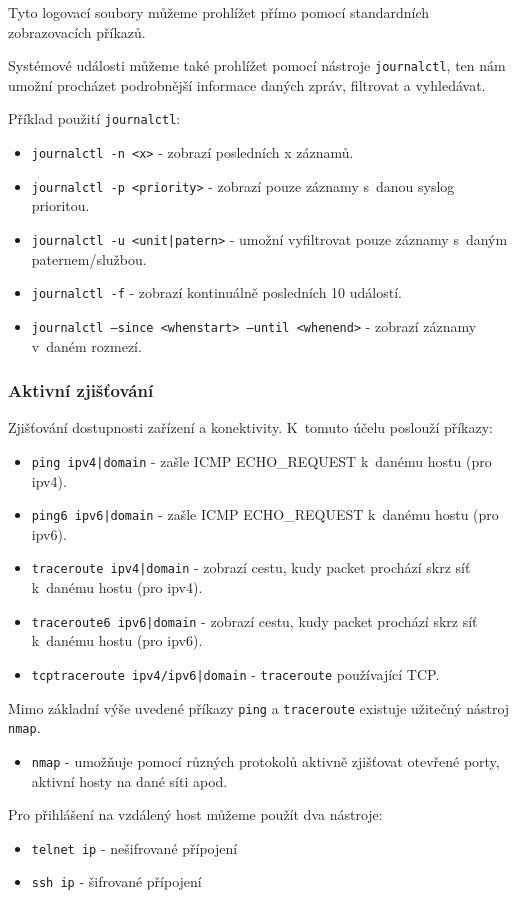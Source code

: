 Tyto logovací soubory můžeme prohlížet přímo pomocí standardních zobrazovacích příkazů.

Systémové události můžeme také prohlížet pomocí nástroje \texttt{journalctl}, ten nám umožní procházet podrobnější informace daných zpráv, filtrovat a vyhledávat.

Příklad použití \texttt{journalctl}:
\begin{itemize}
				\item \texttt{journalctl -n <x>} - zobrazí posledních x záznamů.
				\item \texttt{journalctl -p <priority>} - zobrazí pouze záznamy s~danou syslog prioritou.
				\item \texttt{journalctl -u <unit|patern>} - umožní vyfiltrovat pouze záznamy s~daným paternem/službou.
				\item \texttt{journalctl -f} - zobrazí kontinuálně posledních 10 událostí.
				\item \texttt{journalctl --since <whenstart> --until <whenend>} - zobrazí záznamy v~daném rozmezí.
\end{itemize}


\subsubsection{Aktivní zjišťování}
Zjišťování dostupnosti zařízení a konektivity. K~tomuto účelu poslouží příkazy:

\begin{itemize}
				\item \texttt{ping ipv4|domain} - zašle ICMP ECHO\_REQUEST k~danému hostu (pro ipv4).
				\item \texttt{ping6 ipv6|domain} - zašle ICMP ECHO\_REQUEST k~danému hostu (pro ipv6).
				\item \texttt{traceroute ipv4|domain} - zobrazí cestu, kudy packet prochází skrz síť k~danému hostu (pro ipv4).
				\item \texttt{traceroute6 ipv6|domain} - zobrazí cestu, kudy packet prochází skrz síť k~danému hostu (pro ipv6).
				\item \texttt{tcptraceroute ipv4/ipv6|domain} - \texttt{traceroute} používající TCP.
\end{itemize}

Mimo základní výše uvedené příkazy \texttt{ping} a \texttt{traceroute}
existuje užitečný nástroj \texttt{nmap}.

\begin{itemize}
				\item \texttt{nmap} - umožňuje pomocí různých protokolů aktivně zjišťovat otevřené porty, aktivní hosty na dané síti apod.
\end{itemize}


Pro přihlášení na vzdálený host můžeme použít dva nástroje:
\begin{itemize}
				\item \texttt{telnet ip} - nešifrované přípojení
				\item \texttt{ssh ip} - šifrované přípojení
\end{itemize}



